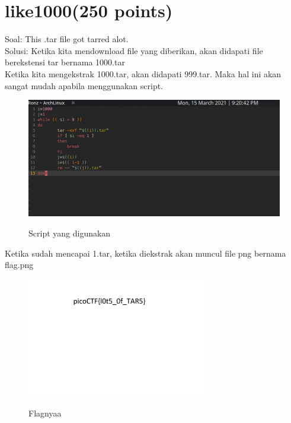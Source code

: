 \documentclass[a4paper,12pt]{article}
\begin{document}
\section{\textbf{like1000(250 points)}}
\vspace{1cm}
Soal: This .tar file got tarred alot. \\
Solusi: Ketika kita mendownload file yang diberikan, akan didapati file berekstensi tar bernama 1000.tar\\
Ketika kita mengekstrak 1000.tar, akan didapati 999.tar. Maka hal ini akan sangat mudah apabila menggunakan script.
\begin{figure}[H]
 \centering
\includegraphics[width=1\textwidth]{like1000script.png}\\
\caption{Script yang digunakan}
\end{figure}
Ketika sudah mencapai 1.tar, ketika diekstrak akan muncul file png bernama flag.png
\begin{figure}[H]
 \centering
\includegraphics[width=0.7\textwidth]{like1000flag.png}\\
\caption{Flagnyaa}
\end{figure}
\end{document}
